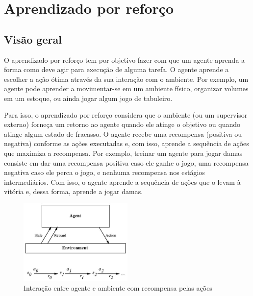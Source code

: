 \chapter{Aprendizado por reforço}


\section{Visão geral}

O aprendizado por reforço tem por objetivo fazer com que um agente aprenda a forma como deve agir para execução de alguma tarefa. O agente aprende a escolher a ação ótima através da sua interação com o ambiente. Por exemplo, um agente pode aprender a movimentar-se em um ambiente físico, organizar volumes em um estoque, ou ainda jogar algum jogo de tabuleiro.

Para isso, o aprendizado por reforço considera que o ambiente (ou um supervisor externo) forneça um retorno ao agente quando ele atinge o objetivo ou quando atinge algum estado de fracasso. O agente recebe uma recompensa (positiva ou negativa) conforme as ações executadas e, com isso, aprende a sequência de ações que maximiza a recompensa. Por exemplo, treinar um agente para jogar damas consiste em dar uma recompensa positiva caso ele ganhe o jogo, uma recompensa negativa caso ele perca o jogo, e nenhuma recompensa nos estágios intermediários. Com isso, o agente aprende a sequência de ações que o levam à vitória e, dessa forma, aprende a jogar damas.

\begin{figure}
	\centering
	\includegraphics[width=0.5\textwidth]{img/agente-ambiente-recompensa}
	\caption{Interação entre agente e ambiente com recompensa pelas ações}
	\label{fig:agente-ambiente-recompensa}
\end{figure}

